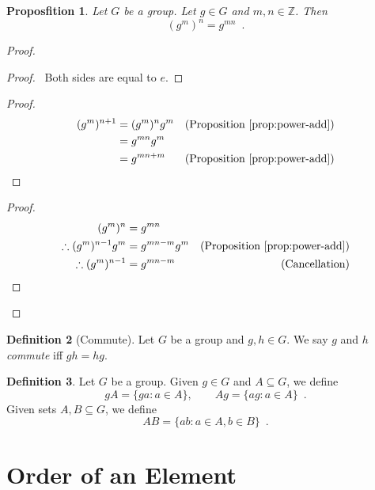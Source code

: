 \documentclass{book}
\let\qed\relax
\newtheorem{prop}{Proposfition}[chapter]
\theoremstyle{definition}
\newtheorem{df}[prop]{Definition}
\begin{document}
\begin{prop}
    \label{prop:power-mult}
    Let $G$ be a group. Let $g \in G$ and $m,n \in \mathbb{Z}$. Then
    \[ (g^m)^n = g^{mn} \enspace . \]
\end{prop}

\begin{proof}
    \pf
    \begin{proof}
        \pf\ Both sides are equal to $e$.
    \end{proof}
    \begin{proof}
        \pf
        \begin{align*}
            (g^m)^{n+1} & = (g^m)^n g^m & (\text{Proposition \ref{prop:power-add}}) \\
                        & = g^{mn} g^m                                              \\
                        & = g^{mn + m}  & (\text{Proposition \ref{prop:power-add}})
        \end{align*}
    \end{proof}
    \begin{proof}
        \pf
        \begin{align*}
            (g^m)^n                    & = g^{mn}                                                   \\
            \therefore (g^m)^{n-1} g^m & = g^{mn-m} g^m & (\text{Proposition \ref{prop:power-add}}) \\
            \therefore (g^m)^{n-1}     & = g^{mn-m}     & (\text{Cancellation})
        \end{align*}
    \end{proof}
    \qed
\end{proof}

\begin{df}[Commute]
    Let $G$ be a group and $g,h \in G$. We say $g$ and $h$ \emph{commute} iff $gh = hg$.
\end{df}

\begin{df}
Let $G$ be a group. Given $g \in G$ and $A \subseteq G$, we define
\[ gA = \{ ga : a \in A \}, \qquad Ag = \{ ag : a \in A \} \enspace . \]
Given sets $A,B \subseteq G$, we define
\[ AB = \{ ab : a \in A, b \in B \} \enspace . \]
\end{df}

\section{Order of an Element}
\end{document}
